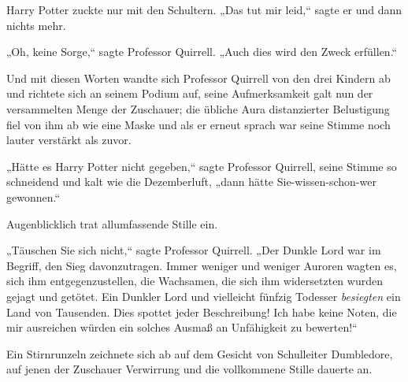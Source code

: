 Harry Potter zuckte nur mit den Schultern. „Das tut mir leid,“ sagte er und dann nichts mehr.

„Oh, keine Sorge,“ sagte Professor Quirrell. „Auch dies wird den Zweck erfüllen.“

Und mit diesen Worten wandte sich Professor Quirrell von den drei Kindern ab und richtete sich an seinem Podium auf, seine Aufmerksamkeit galt nun der versammelten Menge der Zuschauer; die übliche Aura distanzierter Belustigung fiel von ihm ab wie eine Maske und als er erneut sprach war seine Stimme noch lauter verstärkt als zuvor.

„Hätte es Harry Potter nicht gegeben,“ sagte Professor Quirrell, seine Stimme so schneidend und kalt wie die Dezemberluft, „dann hätte Sie-wissen-schon-wer gewonnen.“

Augenblicklich trat allumfassende Stille ein.

\later

„Täuschen Sie sich nicht,“ sagte Professor Quirrell. „Der Dunkle Lord war im Begriff, den Sieg davonzutragen. Immer weniger und weniger Auroren wagten es, sich ihm entgegenzustellen, die Wachsamen, die sich ihm widersetzten wurden gejagt und getötet. Ein Dunkler Lord und vielleicht fünfzig Todesser \emph{besiegten} ein Land von Tausenden. Dies spottet jeder Beschreibung! Ich habe keine Noten, die mir ausreichen würden ein solches Ausmaß an Unfähigkeit zu bewerten!“

Ein Stirnrunzeln zeichnete sich ab auf dem Gesicht von Schulleiter Dumbledore, auf jenen der Zuschauer Verwirrung und die vollkommene Stille dauerte an.

